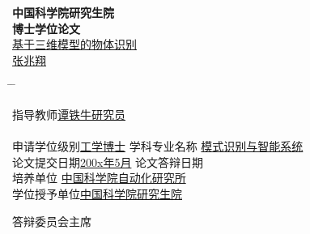 \vspace*{1.7cm} %
\begin{center}
{\Huge \song \textbf{中国科学院研究生院}}\\
\vspace{0.8cm} {\Huge \song \textbf{博士学位论文}}\\
\vspace{1.8cm}
{\xiaoerhao \song \underline{基于三维模型的物体识别}}\\
\vspace{1.1cm} {\sanhao \underline{\;张\;兆\;翔\;}}\\
\end{center}
\sanhao \vspace{1.2cm}
\begin{tabbing}
\hspace*{-0.8cm} \= \hspace{6.4cm} \= \kill

\>指导教师\underline{\hspace{4.8cm}谭铁牛\;\;研究员\hspace{4.6cm}}\\

\>\hspace{2.0cm} \underline{\hspace{13.1cm}}\\

\>申请学位级别\underline{\hspace{0.5cm}工学博士\hspace{0.5cm}} \>学科专业名称 \underline{\hspace{0.2cm}模式识别与智能系统\hspace{0.2cm}}\\

\>论文提交日期\underline{\hspace{0.4cm}200x年5月\hspace{0.4cm}} \> 论文答辩日期\underline{\hspace{5.4cm}}\\

\>培养单位 \underline{\hspace{3.5cm}中国科学院自动化研究所 \hspace{3.5cm}} \\

\>学位授予单位\underline{\hspace{3cm}中国科学院研究生院 \hspace{4.0cm}} \\
\end{tabbing}
\vspace{0.5cm}
\hspace*{7.1cm}答辩委员会主席\underline{\hspace{3.4cm}}
